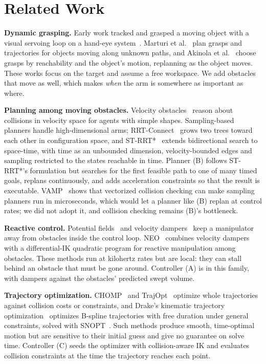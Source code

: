\documentclass[conference]{IEEEtran}
\begin{document}
\section{Related Work}

\textbf{Dynamic grasping.} Early work tracked and grasped a moving object with a visual servoing loop
on a hand-eye system~\cite{allen1993tracking}. Marturi et al.~\cite{marturi2019dynamic} plan grasps and
trajectories for objects moving along unknown paths, and Akinola et al.~\cite{akinola2021dynamic}
choose grasps by reachability and the object's motion, replanning as the object moves. These works
focus on the target and assume a free workspace. We add obstacles that move as well, which makes
\emph{when} the arm is somewhere as important as where.

\textbf{Planning among moving obstacles.} Velocity obstacles~\cite{fiorini1998velocity} reason about
collisions in velocity space for agents with simple shapes. Sampling-based planners handle
high-dimensional arms; RRT-Connect~\cite{kuffner2000rrtconnect} grows two trees toward each other in
configuration space, and ST-RRT*~\cite{grothe2022strrt} extends bidirectional search to space-time,
with time as an unbounded dimension, velocity-bounded edges and sampling restricted to the states
reachable in time. Planner (B) follows ST-RRT*'s formulation but searches for the first feasible path
to one of many timed goals, replans continuously, and adds acceleration constraints so that the result
is executable. VAMP~\cite{thomason2024vamp} shows that vectorized collision checking can make sampling
planners run in microseconds, which would let a planner like (B) replan at control rates; we did not
adopt it, and collision checking remains (B)'s bottleneck.

\textbf{Reactive control.} Potential fields~\cite{khatib1986realtime} and velocity
dampers~\cite{faverjon1987local} keep a manipulator away from obstacles inside the control loop.
NEO~\cite{haviland2021neo} combines velocity dampers with a differential-IK quadratic program for
reactive manipulation among obstacles. These methods run at kilohertz rates but are local: they can
stall behind an obstacle that must be gone around. Controller (A) is in this family, with dampers
against the obstacles' predicted swept volume.

\textbf{Trajectory optimization.} CHOMP~\cite{ratliff2009chomp} and TrajOpt~\cite{schulman2014trajopt}
optimize whole trajectories against collision costs or constraints, and Drake's kinematic trajectory
optimization~\cite{tedrake2019drake,tedrake2024manipulation} optimizes B-spline trajectories with free
duration under general constraints, solved with SNOPT~\cite{gill2005snopt}. Such methods produce smooth,
time-optimal motion but are sensitive to their initial guess and give no guarantee on solve time.
Controller (C) seeds the optimizer with collision-aware IK and evaluates collision constraints at the
time the trajectory reaches each point.
\end{document}

